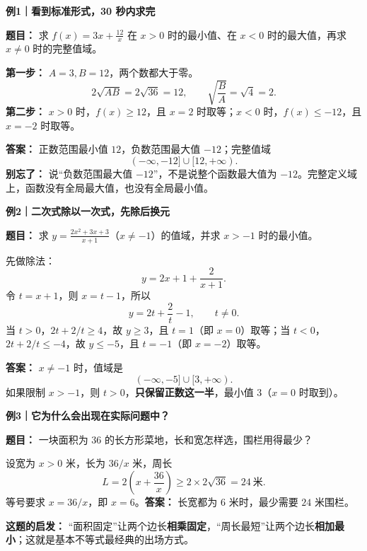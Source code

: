 \clearpage
\begin{examplebox}
\textbf{例1｜看到标准形式，30 秒内求完}



\textbf{题目：} 求 $f(x)=3x+\frac{12}{x}$ 在 $x>0$ 时的最小值、在 $x<0$ 时的最大值，再求 $x\ne0$ 时的完整值域。

\textbf{第一步：} $A=3,B=12$，两个数都大于零。
\[
2\sqrt{AB}=2\sqrt{36}=12,\qquad
\sqrt{\frac BA}=\sqrt4=2.
\]
\textbf{第二步：} $x>0$ 时，$f(x)\ge12$，且 $x=2$ 时取等；$x<0$ 时，$f(x)\le-12$，且 $x=-2$ 时取等。

\textbf{答案：} 正数范围最小值 $12$，负数范围最大值 $-12$；完整值域
\[
\boxed{(-\infty,-12]\cup[12,+\infty)}.
\]
\textbf{别忘了：} 说“负数范围最大值 $-12$”，不是说整个函数最大值为 $-12$。完整定义域上，函数没有全局最大值，也没有全局最小值。

\medskip
\end{examplebox}
\clearpage
\begin{examplebox}
\textbf{例2｜二次式除以一次式，先除后换元}



\textbf{题目：} 求 $y=\frac{2x^2+3x+3}{x+1}$（$x\ne-1$）的值域，并求 $x>-1$ 时的最小值。

先做除法：
\[
y=2x+1+\frac2{x+1}.
\]
令 $t=x+1$，则 $x=t-1$，所以
\[
y=2t+\frac2t-1,\qquad t\ne0.
\]
当 $t>0$，$2t+2/t\ge4$，故 $y\ge3$，且 $t=1$（即 $x=0$）取等；当 $t<0$，$2t+2/t\le-4$，故 $y\le-5$，且 $t=-1$（即 $x=-2$）取等。

\textbf{答案：} $x\ne-1$ 时，值域是
\[
\boxed{(-\infty,-5]\cup[3,+\infty)}.
\]
如果限制 $x>-1$，则 $t>0$，\textbf{只保留正数这一半}，最小值 $3$（$x=0$ 时取到）。

\medskip
\end{examplebox}
\clearpage
\begin{examplebox}
\textbf{例3｜它为什么会出现在实际问题中？}



\textbf{题目：} 一块面积为 $36$ 的长方形菜地，长和宽怎样选，围栏用得最少？

设宽为 $x>0$ 米，长为 $36/x$ 米，周长
\[
L=2\left(x+\frac{36}{x}\right)
\ge2\times2\sqrt{36}=24\ \text{米}.
\]
等号要求 $x=36/x$，即 $x=6$。\textbf{答案：} 长宽都为 $6$ 米时，最少需要 $24$ 米围栏。

\textbf{这题的启发：} “面积固定”让两个边长\textbf{相乘固定}，“周长最短”让两个边长\textbf{相加最小}；这就是基本不等式最经典的出场方式。

\medskip
\end{examplebox}
